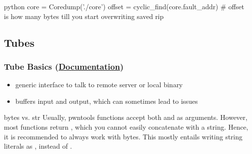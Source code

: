 \documentclass[aspectratio=169]{beamer}
\newcommand{\docl}[1]{(\textbf{\href{#1}{Documentation}})}
\begin{document}
{\begin{frame}[fragile]
\begin{codebox}{python}
core = Coredump('./core')
offset = cyclic_find(core.fault_addr)
# offset is how many bytes till you start overwriting saved rip\end{codebox}
\end{frame}

\subsection{Tubes}

\begin{frame}[fragile]
    \frametitle{Tube Basics \docl{http://docs.pwntools.com/en/stable/tubes.html}}
    \begin{itemize}
        \item generic interface to talk to remote server or local binary
        \item buffers input and output, which can sometimes lead to issues
    \end{itemize}
    \begin{alertblock}{bytes vs. str}
        Usually, pwntools functions accept both  and  as arguments.
        However, most functions return , which you cannot easily concatenate with a string.
        Hence, it is recommended to always work with bytes. This mostly entails writing string literals as , instead of .
    \end{alertblock}
\end{frame}

}
\end{document}
